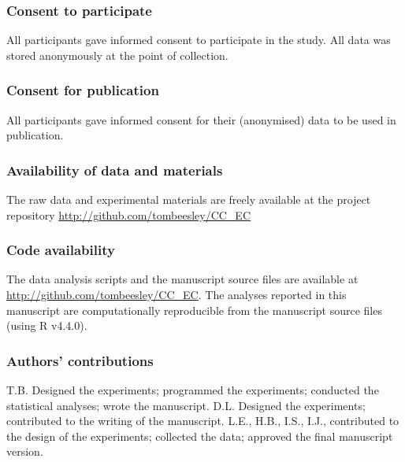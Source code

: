 \documentclass[
  man,
  floatsintext,
  longtable,
  nolmodern,
  notxfonts,
  notimes,
  colorlinks=true,linkcolor=blue,citecolor=blue,urlcolor=blue]{apa7}
\begin{document}
\subsubsection{Consent to participate}\label{consent-to-participate}

All participants gave informed consent to participate in the study. All
data was stored anonymously at the point of collection.

\subsubsection{Consent for publication}\label{consent-for-publication}

All participants gave informed consent for their (anonymised) data to be
used in publication.

\subsubsection{Availability of data and
materials}\label{availability-of-data-and-materials}

The raw data and experimental materials are freely available at the
project repository \url{http://github.com/tombeesley/CC_EC}

\subsubsection{Code availability}\label{code-availability}

The data analysis scripts and the manuscript source files are available
at \url{http://github.com/tombeesley/CC_EC}. The analyses reported in
this manuscript are computationally reproducible from the manuscript
source files (using R v4.4.0).

\subsubsection{Authors' contributions}\label{authors-contributions}

T.B. Designed the experiments; programmed the experiments; conducted the
statistical analyses; wrote the manuscript. D.L. Designed the
experiments; contributed to the writing of the manuscript. L.E., H.B.,
I.S., I.J., contributed to the design of the experiments; collected the
data; approved the final manuscript version.

\newpage
\end{document}
